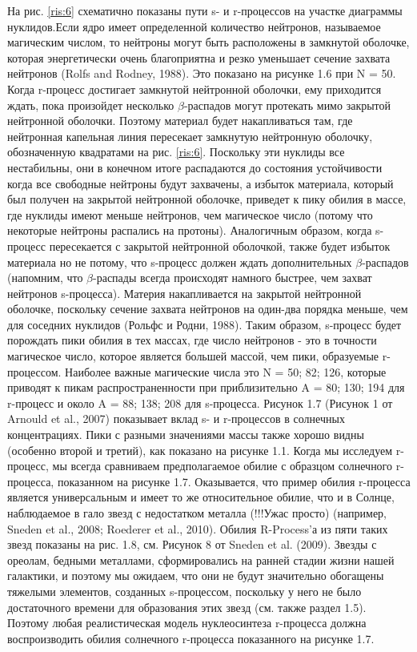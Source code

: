 \documentclass[%
bachelor,    %
natbib,      %
subf,        %
href,        %
colorlinks,  %
]{disser}
\begin{document}
На рис. \ref{ris:6} схематично показаны пути s- и r-процессов на участке диаграммы нуклидов.Если ядро имеет определенной количество нейтронов, называемое магическим числом, то нейтроны могут быть расположены в замкнутой оболочке, которая энергетически очень благоприятна и резко уменьшает сечение захвата нейтронов (Rolfs and Rodney, 1988). Это показано на рисунке 1.6 при N = 50. Когда r-процесс достигает замкнутой нейтронной оболочки, ему приходится ждать, пока произойдет несколько $\beta$-распадов могут протекать мимо закрытой нейтронной оболочки. Поэтому материал будет накапливаться там, где нейтронная капельная линия пересекает замкнутую нейтронную оболочку, обозначенную квадратами на рис. \ref{ris:6}. Поскольку эти нуклиды все нестабильны, они в конечном итоге распадаются до состояния устойчивости когда все свободные нейтроны будут захвачены, а избыток материала, который был получен на закрытой нейтронной оболочке, приведет к пику обилия в массе, где нуклиды имеют меньше нейтронов, чем магическое число (потому что некоторые нейтроны распались на протоны). Аналогичным образом, когда s-процесс пересекается с закрытой нейтронной оболочкой, также будет избыток материала но не потому, что s-процесс должен ждать дополнительных $\beta$-распадов (напомним, что $\beta$-распады всегда происходят намного быстрее, чем захват нейтронов s-процесса). Материя накапливается на закрытой нейтронной оболочке, поскольку сечение захвата нейтронов на один-два порядка меньше, чем для соседних нуклидов (Рольфс и Родни, 1988). Таким образом, s-процесс будет порождать пики обилия в тех массах, где число нейтронов - это в точности магическое число, которое является большей массой, чем пики, образуемые r-процессом. Наиболее важные магические числа это N = 50; 82; 126, которые приводят к пикам распространенности при приблизительно A = 80; 130; 194 для r-процесс и около A = 88; 138; 208 для s-процесса. Рисунок 1.7 (Рисунок 1 от Arnould et al., 2007) показывает вклад s- и r-процессов в солнечных концентрациях. Пики с разными значениями массы также хорошо видны (особенно второй и третий), как показано на рисунке 1.1. Когда мы исследуем r-процесс, мы всегда сравниваем предполагаемое обилие с образцом солнечного r-процесса, показанном на рисунке 1.7. Оказывается, что пример обилия r-процесса является универсальным и имеет то же относительное обилие, что и в Солнце, наблюдаемое в гало звезд с недостатком металла (!!!Ужас просто) (например, Sneden et al., 2008; Roederer et al., 2010). Обилия R-Process'а из пяти таких звезд показаны на рис. 1.8, см. Рисунок 8 от Sneden et al. (2009). Звезды с ореолам, бедными металлами, сформировались на ранней стадии жизни нашей галактики, и поэтому мы ожидаем, что они не будут значительно обогащены тяжелыми элементов, созданных s-процессом, поскольку у него не было достаточного времени для образования этих звезд (см. также раздел 1.5). Поэтому любая реалистическая модель нуклеосинтеза r-процесса должна воспроизводить обилия солнечного r-процесса показанного на рисунке 1.7.
\end{document}
